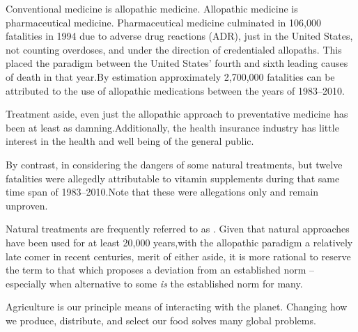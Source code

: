 Conventional medicine is allopathic medicine. Allopathic medicine is pharmaceutical medicine. Pharmaceutical medicine culminated in 106,000 fatalities in 1994 due to adverse drug reactions (ADR), just in the United States, not counting overdoses, and under the direction of credentialed allopaths. This placed the paradigm between the United States' fourth and sixth leading causes of death in that year. By estimation approximately 2,700,000 fatalities can be attributed to the use of allopathic medications between the years of 1983--2010.\footnotecite[leape2000] 

Treatment aside, even just the allopathic approach to preventative medicine has been at least as damning. Additionally, the health insurance industry has little interest in the health and well being of the general public.

By contrast, in considering the dangers of some natural treatments, but twelve fatalities were allegedly attributable to vitamin supplements during that same time span of 1983--2010. Note that these were allegations only and remain unproven. 

Natural treatments are frequently referred to as . Given that natural approaches have been used for at least 20,000 years,\footnotecite[hardy2012] with the allopathic paradigm a relatively late comer in recent centuries, merit of either aside, it is more rational to reserve the term  to that which proposes a deviation from an established norm -- especially when alternative to some {\it is} the established norm for many.


Agriculture is our principle means of interacting with the planet. Changing how we produce, distribute, and select our food solves many global problems.\footnotecite[foodwaste]



